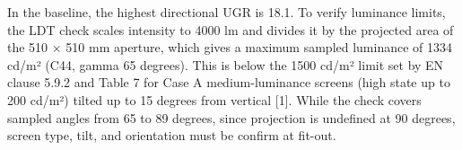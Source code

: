 
In the baseline, the highest directional UGR is 18.1. To verify luminance limits, the LDT check scales intensity to 4000 lm and divides it by the projected area of the 510 × 510 mm aperture, which gives a maximum sampled luminance of 1334 cd/m² (C44, gamma 65 degrees). This is below the 1500 cd/m² limit set by EN clause 5.9.2 and Table 7 for Case A medium-luminance screens (high state up to 200 cd/m²) tilted up to 15 degrees from vertical [1]. While the check covers sampled angles from 65 to 89 degrees, since projection is undefined at 90 degrees, screen type, tilt, and orientation must be confirm at fit-out.
